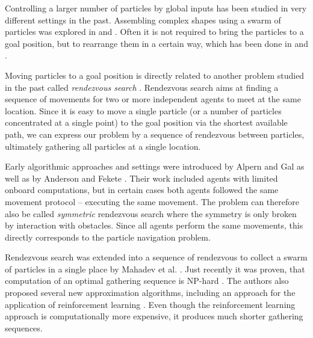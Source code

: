 Controlling a larger number of particles by global inputs has been studied in very different settings in the past. Assembling complex shapes using a swarm of particles was explored in \cite{becker2018tilt} and \cite{balanza2019full}. Often it is not required to bring the particles to a goal position, but to rearrange them in a certain way, which has been done in \cite{becker2013massive} and \cite{zhang2017rearranging}. 

Moving particles to a goal position is directly related to another problem studied in the past called \textit{rendezvous search} \cite{alpern2006theory}. Rendezvous search aims at finding a sequence of movements for two or more independent agents to meet at the same location. Since it is easy to move a single particle (or a number of particles concentrated at a single point) to the goal position via the shortest available path, we can express our problem by a sequence of rendezvous between particles, ultimately gathering all particles at a single location.

 Early algorithmic approaches and settings were introduced by Alpern and Gal \cite{alpern2006theory} as well as by Anderson and Fekete \cite{anderson2001two}. Their work included agents with limited onboard computations, but in certain cases both agents followed the same movement protocol -- executing the same movement. The problem can therefore also be called \textit{symmetric} rendezvous search where the symmetry is only broken by interaction with obstacles. Since all agents perform the same movements, this directly corresponds to the particle navigation problem. 

Rendezvous search was extended into a sequence of rendezvous to collect a swarm of particles in a single place by Mahadev et al. \cite{mahadev2016collecting}. Just recently it was proven, that computation of an optimal gathering sequence is NP-hard \cite{becker2020}. The authors also proposed several new approximation algorithms, including an approach for the application of reinforcement learning \cite{huang2019, becker2020}. Even though the reinforcement learning approach is computationally more expensive, it produces much shorter gathering sequences.

